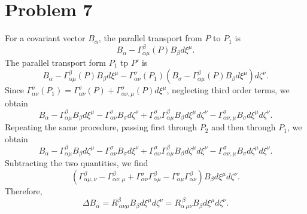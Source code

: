 \documentclass{article}
\begin{document}
\section*{Problem 7}
For a covariant vector $B_\alpha$, the parallel transport from $P$ to $P_1$ is 
\begin{equation}
B_\alpha - \Gamma^\beta_{\alpha\mu}(P)B_\beta d\xi^\mu.
\end{equation}
The parallel transport form $P_1$ tp $P'$ is 
\begin{equation}
B_\alpha - \Gamma^\beta_{\alpha\mu}(P)B_\beta d\xi^\mu
-\Gamma^\sigma_{\alpha \nu}(P_1)(B_\sigma-\Gamma^\beta_{\alpha\mu}(P)B_\beta d\xi^\mu)d \zeta^\nu.
\end{equation}
Since  $\Gamma^\sigma_{\alpha \nu}(P_1) = \Gamma^\sigma_{\alpha \nu}(P) + \Gamma^\sigma_{\alpha \nu, \mu}(P)d \xi^\mu $,
neglecting third order terms, we obtain
\begin{equation}
B_\alpha - \Gamma^\beta_{\alpha\mu}B_\beta d\xi^\mu
-\Gamma^\sigma_{\alpha \nu}B_\sigma d\zeta^\nu
+\Gamma^\sigma_{\alpha \nu}\Gamma^\beta_{\alpha\mu}B_\beta d\xi^\mu d \zeta^\nu
- \Gamma^\sigma_{\alpha \nu, \mu}B_\sigma d \xi^\mu d \zeta^\nu.
\end{equation}
Repeating the same procedure, passing first through $P_2$ and then through $P_1$, we obtain
\begin{equation}
B_\alpha - \Gamma^\beta_{\alpha\mu}B_\beta d\zeta^\mu
-\Gamma^\sigma_{\alpha \nu}B_\sigma d\xi^\nu
+\Gamma^\sigma_{\alpha \nu}\Gamma^\beta_{\alpha\mu}B_\beta d\zeta^\mu d \xi^\nu
- \Gamma^\sigma_{\alpha \nu, \mu}B_\sigma d \zeta^\mu d \xi^\nu.
\end{equation}
Subtracting the two quantities, we find
\begin{equation}
(\Gamma^\beta_{\alpha \mu, \nu}
- \Gamma^\beta_{\alpha \nu, \mu}
+\Gamma^\sigma_{\alpha \nu}\Gamma^\beta_{\alpha\mu}
-\Gamma^\sigma_{\alpha \mu}\Gamma^\beta_{\alpha\nu}  )
B_\beta
d \xi^\mu d \zeta^\nu .
\end{equation}
Therefore,
\begin{equation}
\Delta B_\alpha = R^\beta_{~\alpha \nu \mu}B_\beta d \xi^\mu d \zeta^\nu = R_{\alpha~\mu\nu}^{~\beta}B_\beta d \xi^\mu d \zeta^\nu.
\end{equation}
\end{document}
